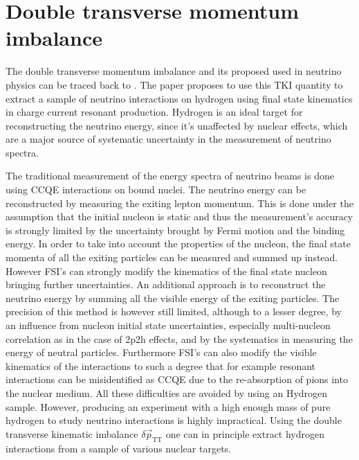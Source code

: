 \section{Double transverse momentum imbalance}
\label{sec:DoubleTKI}
The double transverse momentum imbalance and its proposed used in neutrino physics can be traced back to \cite{PhysRevC.94.015503}. The paper proposes to use this TKI quantity to extract a sample of neutrino interactions on hydrogen using final state kinematics in charge current resonant production. Hydrogen is an ideal target for reconstructing the neutrino energy, since it's unaffected by nuclear effects, which are a major source of systematic uncertainty in the measurement of neutrino spectra. 

The traditional measurement of the energy spectra of neutrino beams is done using CCQE interactions on bound nuclei. The neutrino energy can be reconstructed by measuring the exiting lepton momentum. This is done under the assumption that the initial nucleon is static and thus the measurement's accuracy is strongly limited by the uncertainty brought by Fermi motion and the binding energy.  In order to take into account the properties of the nucleon, the final state momenta of all the exiting particles can be measured and summed up instead. However FSI's can strongly modify the kinematics of the final state nucleon bringing further uncertainties. An additional approach is to reconstruct the neutrino energy by summing all the visible energy of the exiting particles. The precision of this method is however still limited, although to a lesser degree, by an influence from nucleon initial state uncertainties, especially multi-nucleon correlation as in the case of 2p2h effects, and by the systematics in measuring the energy of neutral particles. Furthermore FSI's can also modify the visible kinematics of the interactions to such a degree that for example resonant interactions can be misidentified as CCQE due to the re-absorption of pions into the nuclear medium.  All these difficulties are avoided by using an Hydrogen sample. However, producing an experiment with a high enough mass of pure hydrogen to study neutrino interactions is highly impractical. Using the double transverse kinematic imbalance $\delta \Vec{p}_\text{TT}$ one can in principle extract hydrogen interactions from a sample of various nuclear targets.

